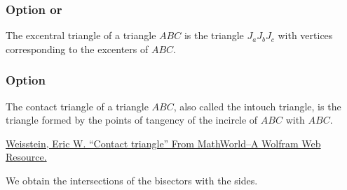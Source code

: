 \subsubsection{Option  or  }

The excentral triangle of a triangle $ABC$ is the triangle $J_aJ_bJ_c$ with
vertices corresponding to the excenters of $ABC$.

\begin{tkzexample}[latex=7cm,small]
\end{tkzexample}

\newpage

\subsubsection{Option }

The contact triangle of a triangle $ABC$, also called the intouch triangle, is
the triangle  formed by the points of tangency of the incircle of $ABC$ with $ABC$.\par
\href{https://mathworld.wolfram.com/ContactTriangle.html}{Weisstein, Eric W.
\enquote{Contact triangle} From MathWorld--A Wolfram Web Resource.}

We obtain the intersections of the bisectors with the sides.

\begin{tkzexample}[latex=7cm,small]
\end{tkzexample}

